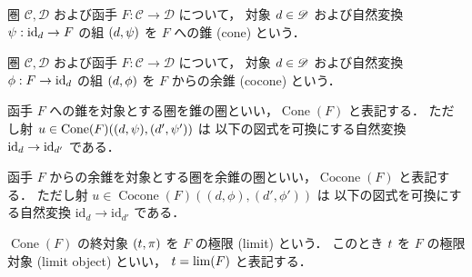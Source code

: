 \documentclass[titlepage]{ltjsreport}
\newcommand{\cat}[1]{\mathscr{#1}}
\newcommand{\obj}[1]{\lowercase{#1}}
\newcommand{\objs}[1]{#1}
\newcommand{\mrp}[3]{{#1}:{#2}\to{#3}}
\newcommand{\mrps}[3]{#1(#2,#3)}
\newcommand{\id}[1]{\mathrm{id}_{#1}}
\DeclareMathOperator{\cone}{Cone}
\DeclareMathOperator{\cocone}{Cocone}
\begin{document}
\begin{definition}[錐]
  圏 $\cat{C},\cat{D}$ および函手 $\mrp{F}{\cat{C}}{\cat{D}}$ について，
  対象 $\obj{d}\in\objs{\cat{D}}$ および自然変換 $\mrp{\psi}{\id{\obj{d}}}{F}$
  の組 $(\obj{d},\psi)$ を $F$ への錐 (cone) という．
\end{definition}

\begin{definition}[余錐]
  圏 $\cat{C},\cat{D}$ および函手 $\mrp{F}{\cat{C}}{\cat{D}}$ について，
  対象 $\obj{d}\in\objs{\cat{D}}$ および自然変換 $\mrp{\phi}{F}{\id{\obj{d}}}$
  の組 $(\obj{d},\phi)$ を $F$ からの余錐 (cocone) という．
\end{definition}

\begin{definition}[錐の圏]
  函手 $F$ への錐を対象とする圏を錐の圏といい，$\cone(F)$ と表記する．
  ただし射 $u\in\mrps{\cone(F)}{(\obj{d},\psi)}{(\obj{d'},\psi')}$ は
  以下の図式を可換にする自然変換 $\id{\obj{d}}\to\id{\obj{d'}}$ である．
  \begin{center}
  \end{center}
\end{definition}

\begin{definition}[余錐の圏]
  函手 $F$ からの余錐を対象とする圏を余錐の圏といい，$\cocone(F)$ と表記する．
  ただし射 $u\in\mrps{\cocone(F)}{(d,\phi)}{(d',\phi')}$ は
  以下の図式を可換にする自然変換 $\id{d}\to\id{d'}$ である．
  \begin{center}
  \end{center}
\end{definition}

\begin{definition}[極限]
  $\cone(F)$ の終対象 $(\obj{t},\pi)$ を $F$ の極限 (limit) という．
  このとき $\obj{t}$ を $F$ の極限対象 (limit object) といい，
  $\obj{t}=\lim(F)$ と表記する．
\end{definition}
\end{document}
